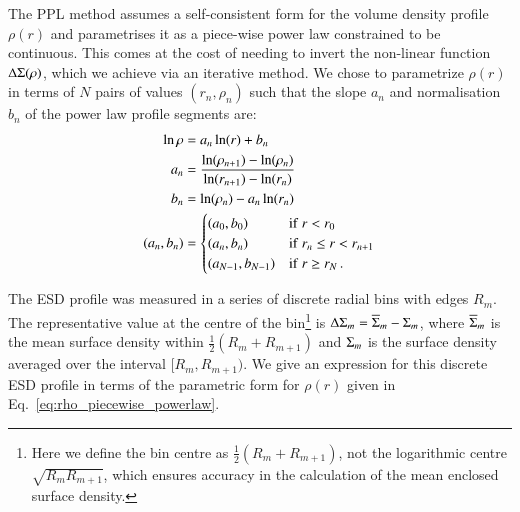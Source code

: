 \documentclass{aa}
\renewcommand{\Upsigma}{{\rm \Sigma}}
\renewcommand{\Updelta}{{\rm \Delta}}
\begin{document}
The PPL method assumes a self-consistent form for the volume density profile $\rho(r)$ and parametrises it as a piece-wise power law constrained to be continuous. This comes at the cost of needing to invert the non-linear function $\Updelta\Upsigma(\rho)$, which we achieve via an iterative method. We chose to parametrize $\rho(r)$ in terms of $N$ pairs of values $(r_n,\rho_n)$ such that the slope $a_n$ and normalisation $b_n$ of the power law profile segments are:
\begin{align}
\ln\rho &= a_n \ln(r) + b_n \\
a_n &= \frac{\ln(\rho_{n+1})-\ln(\rho_n)}{\ln(r_{n+1})-\ln(r_n)}\\
b_n &= \ln(\rho_n) - a_n\ln(r_n)\\
(a_n, b_n) &=
\begin{cases}
(a_0, b_0) & {\rm if}\ r < r_0\\
(a_n, b_n) & {\rm if}\ r_n \leq r < r_{n+1}\\
(a_{N-1}, b_{N-1}) & {\rm if}\ r \geq r_N \, .
\end{cases}
\label{eq:rho_piecewise_powerlaw}\end{align}

\onecolumn

The ESD profile was measured in a series of discrete radial bins with edges $R_m$. The representative value at the centre of the bin\footnote{Here we define the bin centre as $\frac{1}{2}(R_m+R_{m+1})$, not the logarithmic centre $\sqrt{R_mR_{m+1}}$, which ensures accuracy in the calculation of the mean enclosed surface density.} is $\Updelta\Upsigma_m=\overline{\Upsigma}_m-\Upsigma_m$, where $\overline{\Upsigma}_m$ is the mean surface density within $\frac{1}{2}(R_m+R_{m+1})$ and $\Upsigma_m$ is the surface density averaged over the interval $[R_m,R_{m+1})$. We give an expression for this discrete ESD profile in terms of the parametric form for $\rho(r)$ given in Eq.~\ref{eq:rho_piecewise_powerlaw}.
\end{document}
